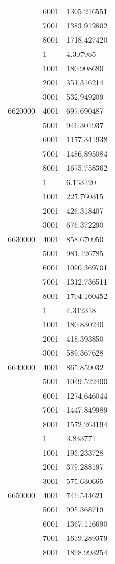 \begin{table}[htb!]
\begin{tabular}{lll}
 & 6001 & 1305.216551 \\
 & 7001 & 1383.912802 \\
 & 8001 & 1718.427420 \\
\multirow[c]{9}{*}{6620000} & 1 & 4.307985 \\
 & 1001 & 180.908680 \\
 & 2001 & 351.316214 \\
 & 3001 & 532.949209 \\
 & 4001 & 697.690487 \\
 & 5001 & 946.301937 \\
 & 6001 & 1177.341938 \\
 & 7001 & 1486.895084 \\
 & 8001 & 1675.758362 \\
\multirow[c]{9}{*}{6630000} & 1 & 6.163120 \\
 & 1001 & 227.760315 \\
 & 2001 & 426.318407 \\
 & 3001 & 676.372290 \\
 & 4001 & 858.670950 \\
 & 5001 & 981.126785 \\
 & 6001 & 1090.369701 \\
 & 7001 & 1312.736511 \\
 & 8001 & 1704.160452 \\
\multirow[c]{9}{*}{6640000} & 1 & 4.342318 \\
 & 1001 & 180.830240 \\
 & 2001 & 418.393850 \\
 & 3001 & 589.367628 \\
 & 4001 & 865.859032 \\
 & 5001 & 1049.522400 \\
 & 6001 & 1274.646044 \\
 & 7001 & 1447.849989 \\
 & 8001 & 1572.264194 \\
\multirow[c]{9}{*}{6650000} & 1 & 3.833771 \\
 & 1001 & 193.233728 \\
 & 2001 & 379.288197 \\
 & 3001 & 575.630665 \\
 & 4001 & 749.544621 \\
 & 5001 & 995.368719 \\
 & 6001 & 1367.116690 \\
 & 7001 & 1639.289379 \\
 & 8001 & 1898.993254 \\

\end{tabular}
\end{table}
